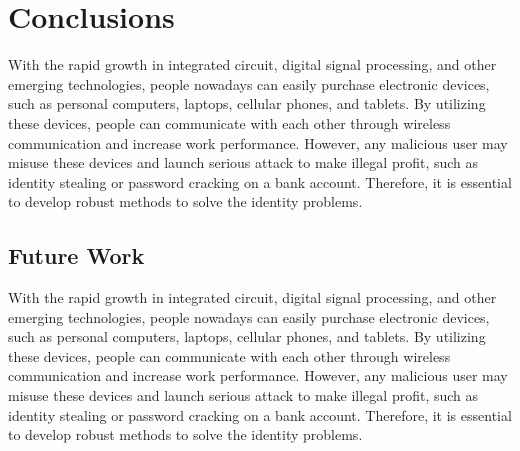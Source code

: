 \chapter{Conclusions}
\label{cha:conclusions}


With the rapid growth in integrated circuit, digital signal processing, and other emerging technologies, people nowadays can easily purchase electronic devices, such as personal computers, laptops, cellular phones, and tablets.  
By utilizing these devices, people can communicate with each other through wireless communication and increase work performance.      
However, any malicious user may misuse these devices and launch serious attack to make illegal profit, such as identity stealing or password cracking on a bank account.
Therefore, it is essential to develop robust methods to solve the identity problems.

\section{Future Work} 
With the rapid growth in integrated circuit, digital signal processing, and other emerging technologies, people nowadays can easily purchase electronic devices, such as personal computers, laptops, cellular phones, and tablets.  
By utilizing these devices, people can communicate with each other through wireless communication and increase work performance.      
However, any malicious user may misuse these devices and launch serious attack to make illegal profit, such as identity stealing or password cracking on a bank account.
Therefore, it is essential to develop robust methods to solve the identity problems.

